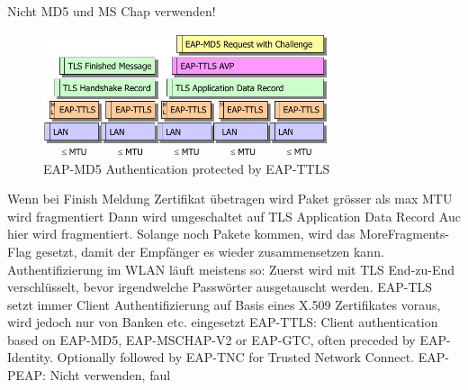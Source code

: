 \documentclass[ngerman,a4paper,12pt]{scrreprt}
\begin{document}
\ul
	\li Nicht MD5 und MS Chap verwenden!
\ulE

\begin{figure}[H]
	\centering
	\includegraphics[width=0.75\textwidth]{img/V10.5.jpg}
	\caption{EAP-MD5 Authentication protected by EAP-TTLS}
	\label{}
\end{figure}

\ul
	\li Wenn bei Finish Meldung Zertifikat übetragen wird \ra Paket grösser als max MTU \ra wird fragmentiert
	\li Dann wird umgeschaltet auf TLS Application Data Record
	\li Auc hier wird fragmentiert. Solange noch Pakete kommen, wird das MoreFragments-Flag gesetzt, damit der Empfänger es wieder zusammensetzen kann.
	\li Authentifizierung im WLAN läuft meistens so: Zuerst wird mit TLS End-zu-End verschlüsselt, bevor irgendwelche Passwörter ausgetauscht werden.
	\li EAP-TLS setzt immer Client Authentifizierung auf Basis eines X.509 Zertifikates voraus, wird jedoch nur von Banken etc. eingesetzt
	\li EAP-TTLS: Client authentication based on EAP-MD5, EAP-MSCHAP-V2 or EAP-GTC,
often preceded by EAP-Identity. Optionally followed by EAP-TNC for
Trusted Network Connect.
	\li EAP-PEAP: Nicht verwenden, faul
\ulE
\end{document}
